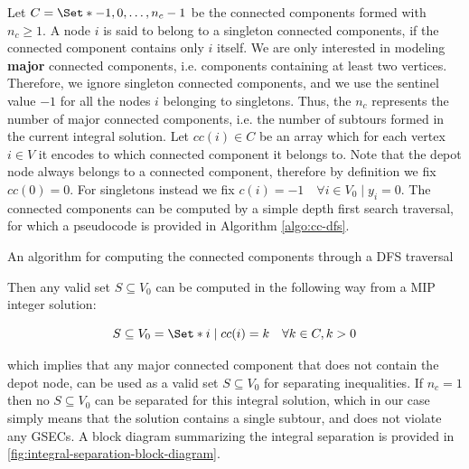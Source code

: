 Let $C = \Set*{-1, 0, \dots, n_c - 1}$ be the connected components formed with $n_c \ge 1$.
A node $i$ is said to belong to a singleton connected components, if the connected component contains only $i$ itself.
We are only interested in modeling \textbf{major} connected components, i.e. components containing at least two vertices.
Therefore, we ignore singleton connected components, and we use the sentinel value $-1$ for all the nodes $i$ belonging to singletons.
Thus, the $n_c$ represents the number of major connected components, i.e. the number of subtours formed in the current integral solution.
Let $cc(i) \in C$ be an array which for each vertex $i \in V$ it encodes to which connected component it belongs to.
Note that the depot node always belongs to a connected component, therefore by definition we fix $cc(0) = 0$.
For singletons instead we fix $c(i) = -1  \quad \forall i \in V_0 \mid y_i = 0$.
The connected components can be computed by a simple depth first search traversal, for which a pseudocode is provided in Algorithm \ref{algo:cc-dfs}.

\begin{algorithm}
	\caption{An algorithm for computing the connected components through a DFS traversal}
	
	\label{algo:cc-dfs}
\end{algorithm}

Then any valid set $S \subseteq V_0$ can be computed in the following way from a MIP integer solution:

\begin{equation}
	S \subseteq V_0 = \Set* {i \mid cc(i) = k}   \quad \forall k \in C, k > 0
\end{equation}

which implies that any major connected component that does not contain the depot node, can be used as a valid set $S \subseteq V_0$ for separating inequalities.
If $n_c = 1$ then no $S \subseteq V_0$ can be separated for this integral solution, which in our case simply means that the solution contains a single subtour, and does not violate any GSECs.
A block diagram summarizing the integral separation is provided in \cref{fig:integral-separation-block-diagram}.



